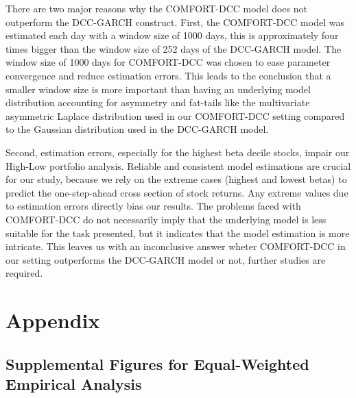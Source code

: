 \documentclass[11pt,a4paper]{article}
\begin{document}
There are two major reasons why the COMFORT-DCC model does not outperform the DCC-GARCH construct. First, the COMFORT-DCC model was estimated each day with a window size of 1000 days, this is approximately four times bigger than the window size of 252 days of the DCC-GARCH model. The window size of 1000 days for COMFORT-DCC was chosen to ease parameter convergence and reduce estimation errors. This leads to the conclusion that a smaller window size is more important than having an underlying model distribution accounting for asymmetry and fat-tails like the multivariate asymmetric Laplace distribution used in our COMFORT-DCC setting compared to the Gaussian distribution used in the DCC-GARCH model.

\noindent
Second, estimation errors, especially for the highest beta decile stocks, impair our High-Low portfolio analysis. Reliable and consistent model estimations are crucial for our study, because we rely on the extreme cases (highest and lowest betas) to predict the one-step-ahead cross section of stock returns. Any extreme values due to estimation errors directly bias our results. The problems faced with COMFORT-DCC do not necessarily imply that the underlying model is less suitable for the task presented, but it indicates that the model estimation is more intricate. This leaves us with an inconclusive answer wheter COMFORT-DCC in our setting outperforms the DCC-GARCH model or not, further studies are required.





\newpage







\newpage
\appendix
\section{Appendix}





\subsection{Supplemental Figures for Equal-Weighted Empirical Analysis}
\end{document}

